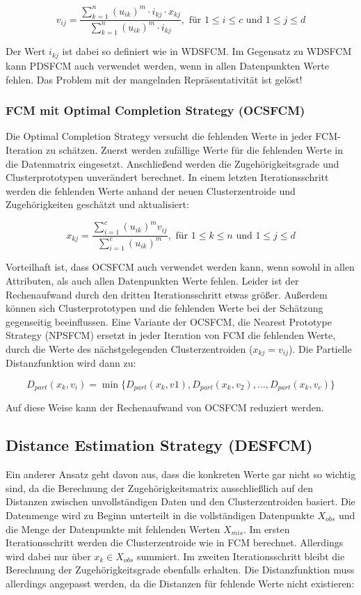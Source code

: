 \documentclass[11pt,ceqn]{book}
\begin{document}
$$v_{ij} = \frac{\sum\limits_{k=1}^n (u_{ik})^m \cdot i_{kj} \cdot x_{kj}}{\sum\limits_{k=1}^n (u_{ik})^m \cdot i_{kj}}, \text{ für } 1 \leqslant i \leqslant c \text{ und } 1 \leqslant j \leqslant d$$

Der Wert $i_{kj}$ ist dabei so definiert wie in WDSFCM. Im Gegensatz zu WDSFCM kann PDSFCM auch verwendet werden, wenn in allen Datenpunkten Werte fehlen. Das Problem mit der mangelnden Repräsentativität ist gelöst!

\subsubsection{FCM mit Optimal Completion Strategy (OCSFCM)}
Die Optimal Completion Strategy \cite{wdsfcm}\cite{pdsfcm} versucht die fehlenden Werte in jeder FCM-Iteration zu schätzen. Zuerst werden zufällige Werte für die fehlenden Werte in die Datenmatrix eingesetzt. Anschließend werden die Zugehörigkeitsgrade und Clusterprototypen unverändert berechnet. In einem letzten Iterationsschritt werden die fehlenden Werte anhand der neuen Clusterzentroide und Zugehörigkeiten geschätzt und aktualisiert:

$$x_{kj} = \frac{\sum\limits_{i=1}^c (u_{ik})^m v_{ij}}{\sum\limits_{i=1}^c (u_{ik})^m}, \text{ für } 1 \leqslant k \leqslant n \text{ und } 1 \leqslant j \leqslant d$$

Vorteilhaft ist, dass OCSFCM auch verwendet werden kann, wenn sowohl in allen Attributen, als auch allen Datenpunkten Werte fehlen. Leider ist der Rechenaufwand durch den dritten Iterationsschritt etwas größer. Außerdem können sich Clusterprototypen und die fehlenden Werte bei der Schätzung gegenseitig beeinflussen. Eine Variante der OCSFCM, die Nearest Prototype Strategy (NPSFCM) ersetzt in jeder Iteration von FCM die fehlenden Werte, durch die Werte des nächstgelegenden Clusterzentroiden ($x_{kj} = v_{ij}$). Die Partielle Distanzfunktion wird dann zu:

$$D_{part}(x_k,v_i) = \min\{D_{part}(x_k,v1),D_{part}(x_k,v_2),\dots,D_{part}(x_k,v_c)\}$$

Auf diese Weise kann der Rechenaufwand von OCSFCM reduziert werden. 


\subsection{Distance Estimation Strategy (DESFCM)}
Ein anderer Ansatz \cite{desfcm} geht davon aus, dass die konkreten Werte gar nicht so wichtig sind, da die Berechnung der Zugehörigkeitsmatrix ausschließlich auf den Distanzen zwischen unvollständigen Daten und den Clusterzentroiden basiert. Die Datenmenge wird zu Beginn unterteilt in die vollständigen Datenpunkte $X_{obs}$ und die Menge der Datenpunkte mit fehlenden Werten $X_{mis}$. Im ersten Iterationsschritt werden die Clusterzentroide wie in FCM berechnet. Allerdings wird dabei nur über $x_k \in X_{obs}$ summiert. Im zweiten Iterationsschritt bleibt die Berechnung der Zugehörigkeitsgrade ebenfalls erhalten. Die Distanzfunktion muss allerdings angepasst werden, da die Distanzen für fehlende Werte nicht existieren:
\end{document}
